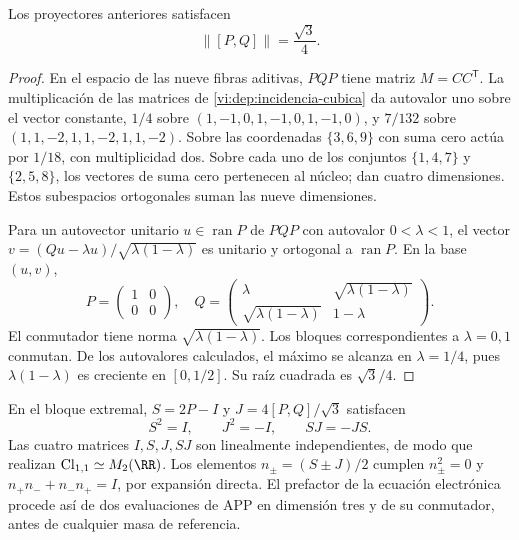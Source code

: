 \begin{proposition}
\label{vi:dep:norma-PQ}
Los proyectores anteriores satisfacen
\begin{equation}
 \|[P,Q]\|=\frac{\sqrt3}{4}.
 \label{vi:dep:prefactor-valor}
\end{equation}
\end{proposition}
\begin{proof}
En el espacio de las nueve fibras aditivas, \(PQP\) tiene matriz
\(M=CC^{\mathsf T}\). La multiplicación de las matrices de
\eqref{vi:dep:incidencia-cubica} da autovalor uno sobre el vector
constante, \(1/4\) sobre \((1,-1,0,1,-1,0,1,-1,0)\), y
\(7/132\) sobre \((1,1,-2,1,1,-2,1,1,-2)\).
Sobre las coordenadas \(\{3,6,9\}\) con suma cero actúa por
\(1/18\), con multiplicidad dos. Sobre cada uno de los conjuntos
\(\{1,4,7\}\) y \(\{2,5,8\}\), los vectores de suma cero
pertenecen al núcleo; dan cuatro dimensiones. Estos subespacios
ortogonales suman las nueve dimensiones.

Para un autovector unitario \(u\in\operatorname{ran}P\) de
\(PQP\) con autovalor \(0<\lambda<1\), el vector
\(v=(Qu-\lambda u)/\sqrt{\lambda(1-\lambda)}\) es unitario y
ortogonal a \(\operatorname{ran}P\). En la base \((u,v)\),
\[
 P=\begin{pmatrix}1&0\\0&0\end{pmatrix},\quad
 Q=\begin{pmatrix}\lambda&\sqrt{\lambda(1-\lambda)}\\
 \sqrt{\lambda(1-\lambda)}&1-\lambda\end{pmatrix}.
\]
El conmutador tiene norma \(\sqrt{\lambda(1-\lambda)}\).
Los bloques correspondientes a \(\lambda=0,1\) conmutan. De los
autovalores calculados, el máximo se alcanza en \(\lambda=1/4\),
pues \(\lambda(1-\lambda)\) es creciente en \([0,1/2]\).
Su raíz cuadrada es \(\sqrt3/4\).
\end{proof}

En el bloque extremal, \(S=2P-I\) y
\(J=4[P,Q]/\sqrt3\) satisfacen
\[
 S^2=I,\qquad J^2=-I,\qquad SJ=-JS.
\]
Las cuatro matrices \(I,S,J,SJ\) son linealmente independientes,
de modo que realizan \(\mathrm{Cl}_{1,1}\simeq M_2(\RR)\).
Los elementos \(n_\pm=(S\pm J)/2\) cumplen
\(n_\pm^2=0\) y \(n_+n_-+n_-n_+=I\), por expansión directa.
El prefactor de la ecuación electrónica procede así de dos evaluaciones
de APP en dimensión tres y de su conmutador, antes de cualquier masa
de referencia.

